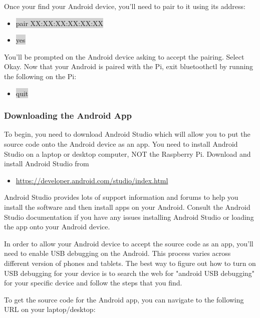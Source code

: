 \documentclass[12pt]{article}
\begin{document}
\noindent Once your find your Android device, you'll need to pair to it using its address:

\begin{itemize} 	
	\item[] \colorbox{lightgray}{pair XX:XX:XX:XX:XX:XX} 
	\item[] \colorbox{lightgray}{yes}
\end{itemize}
	
\noindent You'll be prompted on the Android device asking to accept the pairing. Select Okay. Now that your Android is paired with the Pi, exit bluetoothctl by running the following on the Pi:
\begin{itemize}
	\item[] \colorbox{lightgray}{quit} 
\end{itemize}

\subsubsection{Downloading the Android App}

To begin, you need to download Android Studio which will allow you to put the source code onto the Android device as an app.  You need to install Android Studio on a laptop or desktop computer, NOT the Raspberry Pi.  Download and install Android Studio from 

\begin{itemize}
	\item \href{https://developer.android.com/studio/index.html}{https://developer.android.com/studio/index.html}
\end{itemize}

Android Studio provides lots of support information and forums to help you install the software and then install apps on your Android. Consult the Android Studio documentation if you have any issues installing Android Studio or loading the app onto your Android device.

\noindent In order to allow your Android device to accept the source code as an app, you'll need to enable USB debugging on the Android. This process varies across different version of phones and tablets. The best way to figure out how to turn on USB debugging for your device is to search the web for "android USB debugging" for your specific device and follow the steps that you find.

\bigskip

\noindent To get the source code for the Android app, you can navigate to the following URL on your laptop/desktop:
\end{document}
